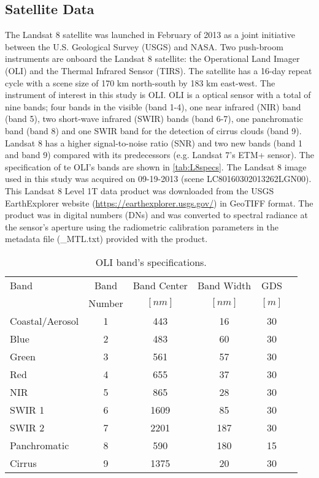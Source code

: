 \documentclass[draft]{spie}  %
\begin{document}
\subsection{Satellite Data}
The Landsat 8 satellite was launched in February of 2013 as a joint initiative between the U.S. Geological Survey (USGS) and NASA. Two push-broom instruments are onboard the Landsat 8 satellite: the Operational Land Imager (OLI) and the Thermal Infrared Sensor (TIRS). The satellite has a 16-day repeat cycle with a scene size of 170 km north-south by 183 km east-west. The instrument of interest in this study is OLI. OLI is a optical sensor with a total of nine bands; four bands in the visible (band 1-4), one near infrared (NIR) band (band 5), two short-wave infrared (SWIR) bands (band 6-7), one panchromatic band (band 8) and one SWIR band for the detection of cirrus clouds (band 9). Landsat 8 has a higher signal-to-noise ratio (SNR) and two new bands (band 1 and band 9) compared with its predecessors (e.g. Landsat 7’s ETM+ sensor). The specification of te OLI's bands are shown in \autoref{tab:L8specs}. The Landsat 8 image used in this study was acquired on 09-19-2013 (scene LC80160302013262LGN00). This Landsat 8 Level 1T data product was downloaded from the USGS EarthExplorer website (\url{https://earthexplorer.usgs.gov/}) in GeoTIFF format. The product was in digital numbers (DNs) and was converted to spectral radiance at the sensor's aperture using the radiometric calibration parameters in the metadata file (\_MTL.txt) provided with the product.


\begin{table}[!ht]
\caption{ OLI band's specifications. \label{tab:L8specs} } 
\vspace{0.2cm}
\centering
\begin{tabular}{lccccl} 
 \hline
Band  			&	Band 		& Band Center 	&	Band Width  &	GDS  	\\ 
      			&   Number 	    &	$[nm]$ 		&	$[nm]$		& $[m]$ 	\\ \hline \hline
Coastal/Aerosol & 	1 			&	443  		& 	16 			& 30	 	\\  	
Blue 			& 	2 			&	483  		& 	60 			& 30	 	\\  	
Green 			& 	3 			&	561  		& 	57 			& 30 	 	\\  	
Red 			& 	4 			&	655  		& 	37 			& 30	 	\\  	
NIR 			& 	5 			&	865  		& 	28			& 30	 	\\  	
SWIR 1 			& 	6 			&	1609 		& 	85 			& 30	 	\\  	
SWIR 2 			& 	7 			&	2201 		& 	187 		& 30	 	\\  	
Panchromatic 	&	8 			&	590  		& 	180 		& 15	 	\\  	
Cirrus 			&	9 			&	1375 		& 	20 			& 30	 	\\	\hline
 \end{tabular}	
\end{table}	
\end{document}
